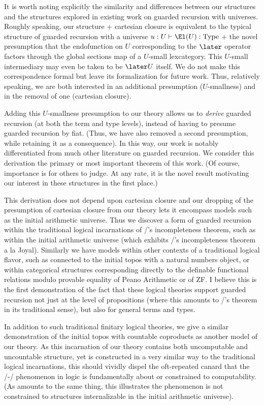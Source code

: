 It is worth noting explicitly the similarity and differences between our structures and the structures explored in existing work on guarded recursion with universes. Roughly speaking, our structure + cartesian closure is equivalent to the typical structure of guarded recursion with a universe $u : U \vdash \El(U) : \mathrm{Type}$ + the novel presumption that the endofunction on $U$ corresponding to the $\later$ operator factors through the global sections map of a $U$-small lexcategory. This $U$-small intermediary may even be taken to be $\later U$ itself. We do not make this correspondence formal but leave its formalization for future work. Thus, relatively speaking, we are both interested in an additional presumption ($U$-smallness) and in the removal of one (cartesian closure).

Adding this $U$-smallness presumption to our theory allows us to \emph{derive} guarded recursion (at both the term and type levels), instead of having to presume guarded recursion by fiat. (Thus, we have also removed a second presumption, while retaining it as a consequence). In this way, our work is notably differentiated from much other literature on guarded recursion. We consider this derivation the primary or most important theorem of this work. (Of course, importance is for others to judge. At any rate, it is the novel result motivating our interest in these structures in the first place.)

This derivation does not depend upon cartesian closure and our dropping of the presumption of cartesian closure from our theory lets it encompass models such as the initial arithmetic universe. Thus we discover a form of guarded recursion within the traditional logical incarnations of \Goedel/'s incompleteness theorem, such as within the initial arithmetic universe (which exhibits \Goedel/'s incompleteness theorem a la Joyal). Similarly we have models within other contexts of a traditional logical flavor, such as connected to the initial topos with a natural numbers object, or within categorical structures corresponding directly to the definable functional relations modulo provable equality of Peano Arithmetic or of ZF. I believe this is the first demonstration of the fact that these logical theories support guarded recursion not just at the level of propositions (where this amounts to \Loeb/'s theorem in its traditional sense), but also for general terms and types.

In addition to such traditional finitary logical theories, we give a similar demonstration of the initial topos with countable coproducts as another model of our theory. As this incarnation of our theory contains both uncomputable and uncountable structure, yet is constructed in a very similar way to the traditional logical incarnations, this should vividly dispel the oft-repeated canard that the \Godel/-\Lob/ phenomenon in logic is fundamentally about or constrained to computability. (As amounts to the same thing, this illustrates the phenomenon is not constrained to structures internalizable in the initial arithmetic universe).

